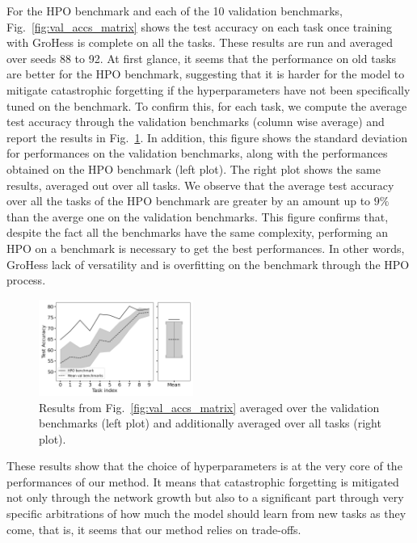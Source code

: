 \documentclass[11pt]{article}
\begin{document}
\vspace{2mm}
\noindent
For the HPO benchmark and each of the 10 validation benchmarks, Fig.~\ref{fig:val_accs_matrix} shows the test accuracy on each task once training with GroHess is complete on all the tasks. These results are run and averaged over seeds 88 to 92. At first glance, it seems that the performance on old tasks are better for the HPO benchmark, suggesting that it is harder for the model to mitigate catastrophic forgetting if the hyperparameters have not been specifically tuned on the benchmark. To confirm this, for each task, we compute the average test accuracy through the validation benchmarks (column wise average) and report the results in Fig.~\ref{fig:accuracy_through_benchmarks}. In addition, this figure shows the standard deviation for performances on the validation benchmarks, along with the performances obtained on the HPO benchmark (left plot). The right plot shows the same results, averaged out over all tasks. We observe that the average test accuracy over all the tasks of the HPO benchmark are greater by an amount up to $9\%$ than the averge one on the validation benchmarks. This figure confirms that, despite the fact all the benchmarks have the same complexity, performing an HPO on a benchmark is necessary to get the best performances. In other words, GroHess lack of versatility and is overfitting on the benchmark through the HPO process.

\begin{figure}
    \centering
    \includegraphics[width=0.45\textwidth]{images/accuracy_through_benchmarks.png}
    \caption{Results from Fig.~\ref{fig:val_accs_matrix} averaged over the validation benchmarks (left plot) and additionally averaged over all tasks (right plot).}
    \label{fig:accuracy_through_benchmarks}
\end{figure}

\vspace{1mm}
\noindent
These results show that the choice of hyperparameters is at the very core of the performances of our method. It means that catastrophic forgetting is mitigated not only through the network growth but also to a significant part through very specific arbitrations of how much the model should learn from new tasks as they come, that is, it seems that our method relies on trade-offs.
\end{document}
